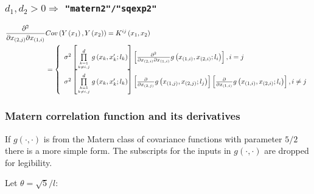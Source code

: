 \documentclass[12pt]{amsart}
\begin{document}
\subsubsection{$d_1, d_2 > 0 \Rightarrow$ \texttt{"matern2"/"sqexp2"}}
\begin{align*}
    \frac{{{\partial ^2}}}{{\partial {x_{\left( {2,j} \right)}}\partial {x_{\left( {1,i} \right)}}}} &Cov\left( {Y\left( {{x_1}} \right),Y\left( {{x_2}} \right)} \right) = {K^{ij}}\left( {{x_1},{x_2}} \right)\\
 &= \left\{ \begin{array}{l}
{\sigma ^2}\left[ {\prod\limits_{k = 1\atop
k \ne i,j}^d {g\left( {{x_k},x{'_k};{l_k}} \right)} } \right]\left[ {\frac{{{\partial ^2}}}{{\partial {x_{\left( {2,i} \right)}}\partial {x_{\left( {1,i} \right)}}}}g\left( {{x_{\left( {1,i} \right)}},{x_{\left( {2,i} \right)}};{l_i}} \right)} \right],i = j\\
{\sigma ^2}\left[ {\prod\limits_{k = 1\atop
k \ne i,j}^d {g\left( {{x_k},x{'_k};{l_k}} \right)} } \right]\left[ {\frac{\partial }{{\partial {x_{\left( {2,j} \right)}}}}g\left( {{x_{\left( {1,j} \right)}},{x_{\left( {2,j} \right)}};{l_j}} \right)} \right]\left[ {\frac{\partial }{{\partial {x_{\left( {1,i} \right)}}}}g\left( {{x_{\left( {1,i} \right)}},{x_{\left( {2,i} \right)}};{l_i}} \right)} \right],i \ne j
    \end{array} \right.
\end{align*}


\bigskip
\subsubsection{Matern correlation function and its derivatives}

If $g(\cdot, \cdot)$ is from the Matern class of covariance functions with parameter $5/2$ there is a more simple form. The subscripts for the inputs in $g(\cdot, \cdot)$ are dropped for legibility. 

Let $\theta = \sqrt{5} / l$:
\end{document}
